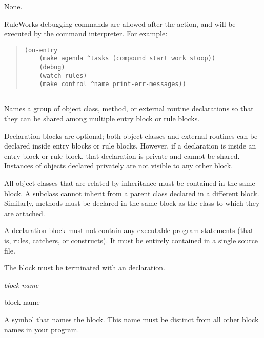 \Format


\Arguments

None.

\Example

RuleWorks debugging commands are allowed after the  action,
and will be executed by the command interpreter. For example:

\begin{quote}
\begin{verbatim}
(on-entry
    (make agenda ^tasks (compound start work stoop))
    (debug)
    (watch rules)
    (make control ^name print-err-messages))
\end{verbatim}
\end{quote}

\subsection{}

Names a group of object class, method, or external routine
declarations so that they can be shared among multiple entry block or
rule blocks.

Declaration blocks are optional; both object classes and external
routines can be declared inside entry blocks or rule blocks.  However,
if a declaration is inside an entry block or rule block, that
declaration is private and cannot be shared. Instances of objects
declared privately are not visible to any other block.

All object classes that are related by inheritance must be contained
in the same block. A subclass cannot inherit from a parent class
declared in a different block. Similarly, methods must be declared in
the same block as the class to which they are attached.

A declaration block must not contain any executable program statements
(that is, rules, catchers, or  constructs). It must be
entirely contained in a single source file.

The block must be terminated with an  declaration.

\Format

 \it{block-name}

\begin{argument}
\item[block-name]

  A symbol that names the block. This name must be distinct from all
  other block names in your program.
\end{argument}

